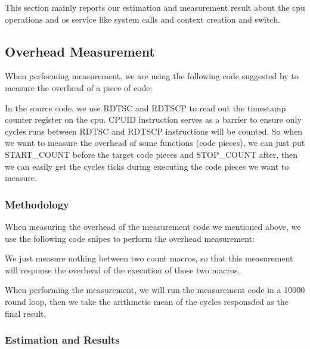 
This section mainly reports our estimation and measurement result about the cpu operations and os service like system calls and context creation and switch.


\subsection{Overhead Measurement}
When performing measurement, we are using the following code suggested by \cite{intel:whitebook} to measure the overhead of a piece of code:



In the source code, we use RDTSC and RDTSCP to read out the timestamp counter register on the cpu. CPUID instruction serves as a barrier to ensure only cycles
runs between RDTSC and RDTSCP instructions will be counted. So when we want to measure the overhead of some functions (code pieces), we can just put START\_COUNT
before the target code pieces and STOP\_COUNT after, then we can easily get the cycles ticks during executing the code pieces we want to measure.


\subsubsection{Methodology}
When measuring the overhead of the measurement code we mentioned above, we use the following code snipes to perform the overhead measurement:



We just measure nothing between two count macros, so that this measurement will response the overhead of the execution of those two macros.

When performing the measurement, we will run the measurement code in a 10000 round loop, then we take the arithmetic mean of the cycles responsded as the final result.


\subsubsection{Estimation and Results}
\label{overhead_estimation}

